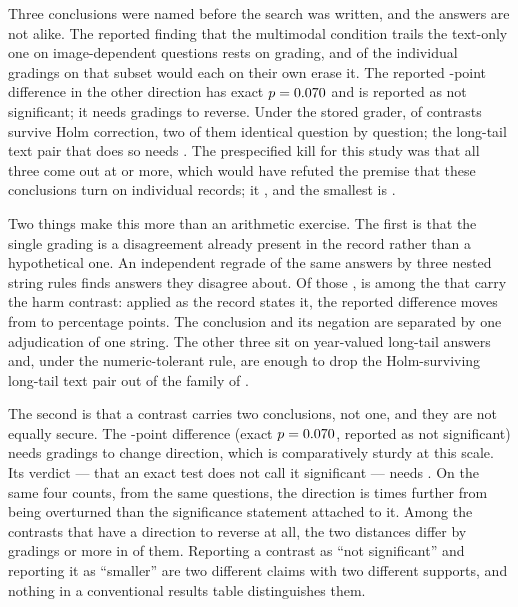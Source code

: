 Three conclusions were named before the search was written, and the answers are
not alike. The reported finding that the multimodal condition trails the
text-only one on image-dependent questions rests on \HarmK{} grading, and
\HarmCandidates{} of the \HarmGradings{} individual gradings on that subset
would each on their own erase it. The reported \HelpDiff{}-point difference in
the other direction has exact \(p=0.070{}\) and is reported as not significant;
it needs \HelpK{} gradings to reverse. Under the stored grader,
\SurvivesHolm{} of \Contrasts{} contrasts survive Holm correction, two of them
identical question by question; the long-tail text pair that does so needs
\SigK{}. The prespecified kill for this study was that all three come out at
\KillThreshold{} or more, which would have refuted the premise that these
conclusions turn on individual records; it \KillState{}, and the smallest is
\SmallestK{}.

Two things make this more than an arithmetic exercise. The first is that the
single grading is a disagreement already present in the record rather than a
hypothetical one. An independent regrade of the same answers by three nested
string rules finds \RegradeContested{} answers they disagree about. Of
those \RegradeContested{}, \RegradeImageFlip{} is among the \HarmCandidates{} that carry the harm
contrast: applied as the record states it, the reported difference moves from
\HarmDiff{} to \RegradedDiff{} percentage points. The conclusion and its
negation are separated by one adjudication of one string. The other three sit
on year-valued long-tail answers and, under the numeric-tolerant rule, are
enough to drop the Holm-surviving long-tail text pair out of the family of
\Contrasts{}.

The second is that a contrast carries two conclusions, not one, and they are not
equally secure. The \HelpDiff{}-point difference (exact \(p=0.070{}\), reported
as not significant) needs \HelpK{} gradings to change direction, which is
comparatively sturdy at this scale. Its verdict --- that an exact test does
not call it significant --- needs \HelpVerdictK{}. On the same four counts,
from the same \SubsetN{} questions, the direction is \HelpRatio{} times further
from being overturned than the significance statement attached to it. Among the
\Directional{} contrasts that have a direction to reverse at all, the two
distances differ by \DecoupledGap{} gradings or more in \DecoupledCount{} of
them. Reporting a contrast as ``not significant'' and reporting it as
``smaller'' are two different claims with two different supports, and nothing
in a conventional results table distinguishes them.

